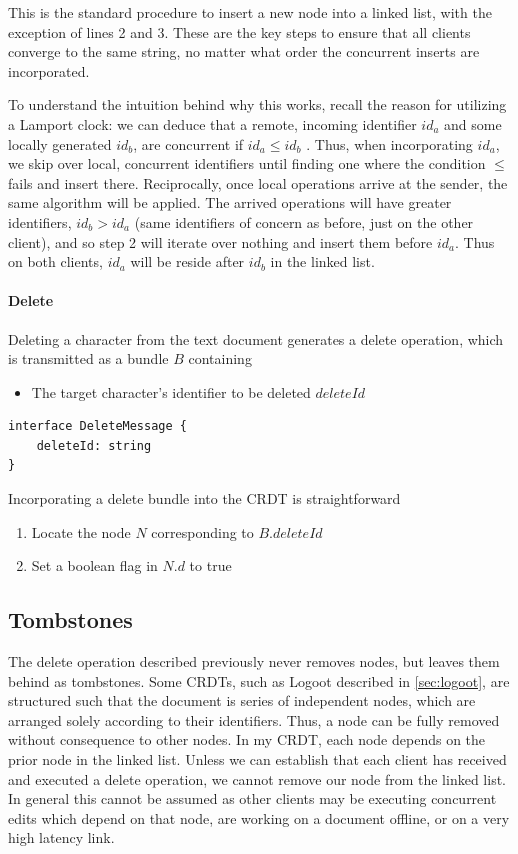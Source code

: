 \documentclass[12pt,a4paper,twoside,openright]{report}
\begin{document}
				This is the standard procedure to insert a new node into a linked list, with the exception of lines 2 and 3. These are the key steps to ensure that all clients converge to the same string, no matter what order the concurrent inserts are incorporated.
				
				To understand the intuition behind why this works, recall the reason for utilizing a Lamport clock: we can deduce that a remote, incoming identifier $id_a$ and some locally generated $id_b$, are concurrent if $id_a \leq id_b$ . Thus, when incorporating $id_a$, we skip over local, concurrent identifiers until finding one where the condition $\leq$ fails and insert there. Reciprocally, once local operations arrive at the sender, the same algorithm will be applied. The arrived operations will have greater identifiers, $id_b > id_a$ (same identifiers of concern as before, just on the other client), and so step 2 will iterate over nothing and insert them before $id_a$. Thus on both clients, $id_a$ will be reside after $id_b$ in the linked list.
				
			\paragraph{Delete}
				Deleting a character from the text document generates a delete operation, which is transmitted as a bundle $B$ containing
				\begin{itemize}
					\item The target character's identifier to be deleted $deleteId$
				\end{itemize}
				
\vspace{3mm}
\begin{lstlisting}[caption=Delete Bundle Type Signature]
interface DeleteMessage {
    deleteId: string
}
\end{lstlisting}				
				
				Incorporating a delete bundle into the CRDT is straightforward
				\begin{enumerate}
					\item Locate the node $N$ corresponding to $B.deleteId$
					\item Set a boolean flag in $N.d$ to true
				\end{enumerate}
				
		\subsection{Tombstones}
			The delete operation described previously never removes nodes, but leaves them behind as tombstones. Some CRDTs, such as Logoot described in \cref{sec:logoot}, are structured such that the document is series of independent nodes, which are arranged solely according to their identifiers. Thus, a node can be fully removed without consequence to other nodes. In my CRDT, each node depends on the prior node in the linked list. Unless we can establish that each client has received and executed a delete operation, we cannot remove our node from the linked list. In general this cannot be assumed as other clients may be executing concurrent edits which depend on that node, are working on a document offline, or on a very high latency link.
			
\end{document}
